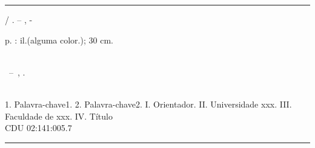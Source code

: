 \documentclass[
    12pt,               %
    openright,          %
    twoside,            %
    a4paper,            %
    chapter=TITLE,     %
    english,            %
    spanish,            %
    portuguese              %
    ]{abntex2}
\begin{document}

\frenchspacing 

\renewcommand{\ABNTEXchapterfontsize}{\LARGE}
\renewcommand{\ABNTEXpartfontsize}{\ABNTEXchapterfontsize}
\renewcommand{\ABNTEXsectionfontsize}{\Large}
\renewcommand{\ABNTEXsubsectionfontsize}{\large}
\renewcommand{\ABNTEXsubsubsectionfontsize}{\normalsize}
\renewcommand{\ABNTEXsubsubsubsectionfontsize}{\normalsize}


\label{capa}
\imprimircapa


\label{folha rosto}
\imprimirfolhaderosto*

\label{ficha catalografica}
\begin{fichacatalografica}
	\sffamily
  \vspace*{10cm} 		%
  \hrule				%
  \begin{center}		%
  \begin{minipage}[c]{12.5cm} %

  \imprimirautor

  \hspace{0.5cm} \imprimirtitulo / \imprimirautor. --
  \imprimirlocal, \imprimirdata-
  
  \hspace{0.5cm} \pageref{LastPage} p. : il.(alguma color.); 30 cm.\\

  \hspace{0.5cm} \imprimirorientadorRotulo ~\imprimirorientador\\

\hspace{0.5cm}
\parbox[t]{\textwidth}{\imprimirtipotrabalho~--~\imprimirinstituicao,
\imprimirdata.}\\

  \hspace{0.5cm}
	1. Palavra-chave1.
	2. Palavra-chave2.
	I. Orientador.
	II. Universidade xxx.
	III. Faculdade de xxx.
	IV. Título\\
	
  \hspace{8.75cm} CDU 02:141:005.7\\
  
  \end{minipage}
  \end{center}
  \hrule
  \newpage
\end{fichacatalografica}
\end{document}
